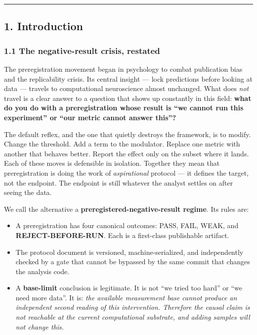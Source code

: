 \documentclass[
]{article}
\providecommand{\tightlist}{%
  \setlength{\itemsep}{0pt}\setlength{\parskip}{0pt}}
\begin{document}
\begin{center}\rule{0.5\linewidth}{0.5pt}\end{center}

\subsection{1. Introduction}\label{introduction}

\subsubsection{1.1 The negative-result crisis,
restated}\label{the-negative-result-crisis-restated}

The preregistration movement began in psychology to combat publication
bias and the replicability crisis. Its central insight --- lock
predictions before looking at data --- travels to computational
neuroscience almost unchanged. What does \emph{not} travel is a clear
answer to a question that shows up constantly in this field:
\textbf{what do you do with a preregistration whose result is ``we
cannot run this experiment'' or ``our metric cannot answer this''?}

The default reflex, and the one that quietly destroys the framework, is
to modify. Change the threshold. Add a term to the modulator. Replace
one metric with another that behaves better. Report the effect only on
the subset where it lands. Each of these moves is defensible in
isolation. Together they mean that preregistration is doing the work of
\emph{aspirational} protocol --- it defines the target, not the
endpoint. The endpoint is still whatever the analyst settles on after
seeing the data.

We call the alternative a \textbf{preregistered-negative-result regime}.
Its rules are:

\begin{itemize}
\tightlist
\item
  A preregistration has four canonical outcomes: PASS, FAIL, WEAK, and
  \textbf{REJECT-BEFORE-RUN}. Each is a first-class publishable
  artifact.
\item
  The protocol document is versioned, machine-serialized, and
  independently checked by a gate that cannot be bypassed by the same
  commit that changes the analysis code.
\item
  A \textbf{base-limit} conclusion is legitimate. It is not ``we tried
  too hard'' or ``we need more data''. It is: \emph{the available
  measurement base cannot produce an independent second reading of this
  intervention. Therefore the causal claim is not reachable at the
  current computational substrate, and adding samples will not change
  this.}
\end{itemize}
\end{document}
